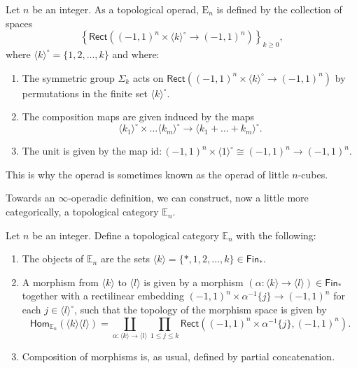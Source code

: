 \documentclass[../text]{subfiles}
\begin{document}
\begin{definition}
    Let $n$ be an integer. As a topological operad, $\mathrm{E}_n$ is defined by the collection of spaces
    \begin{equation}
        \left\{ \mathsf{Rect}((-1,1)^n \times \langle k \rangle^\circ \rightarrow (-1,1)^n)\right\}_{k \geq 0},
    \end{equation}
    where $\langle k \rangle^\circ = \{1, 2, \dots, k\}$ and where:
    \begin{enumerate}
        \item The symmetric group $\Sigma_k$ acts on $\mathsf{Rect}((-1,1)^n \times \langle k \rangle^\circ \rightarrow (-1,1)^n)$ by permutations in the finite set $\langle k \rangle^\circ$.
        \item The composition maps are given induced by the maps
        \begin{equation}
            \langle k_1 \rangle^\circ \times \dots \langle k_m \rangle^\circ \xrightarrow{\quad} \langle k_1 + \dots + k_m \rangle^\circ.
        \end{equation}
        \item The unit is given by the map $\mathrm{id} : (-1,1)^n \times \langle 1 \rangle^\circ \cong (-1,1)^n \rightarrow (-1,1)^n$.
    \end{enumerate}
\end{definition}

\begin{remark}
    This is why the operad is sometimes known as the operad of little $n$-cubes.
\end{remark}

Towards an $\infty$-operadic definition, we can construct, now a little more categorically, a topological category $\mathbb{E}_n$.

\begin{definition}
    Let $n$ be an integer. Define a topological category $\mathbb{E}_n$ with the following:
    \begin{enumerate}
        \item The objects of $\mathbb{E}_n$ are the sets $\langle k \rangle = \{ *, 1, 2, \dots, k\} \in \mathsf{Fin}_*$.
        \item A morphism from $\langle k \rangle$ to $\langle l \rangle$ is given by a morphism $(\alpha : \langle k \rangle \rightarrow \langle l \rangle) \in \mathsf{Fin}_*$ together with a rectilinear embedding $(-1,1)^n \times \alpha^{-1}\{j\} \xrightarrow{\quad} (-1,1)^n$ for each $j \in \langle l \rangle^\circ$, such that the topology of the morphism space is given by 
        \begin{equation}
            \mathsf{Hom}_{\mathbb{E}_n}(\langle k \rangle \langle l \rangle) = \coprod_{\alpha : \langle k \rangle \rightarrow \langle l \rangle} \prod_{1 \leq j \leq k} \mathsf{Rect} ((-1,1)^n \times \alpha^{-1}\{ j\}, (-1,1)^n).
        \end{equation}
        \item Composition of morphisms is, as usual, defined by partial concatenation.
    \end{enumerate}
\end{definition}
\end{document}
